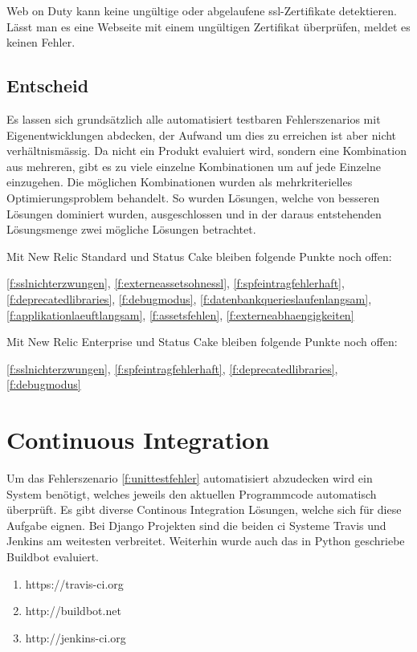 Web on Duty kann keine ungültige oder abgelaufene \acrshort{ssl}-Zertifikate detektieren. Lässt man es eine Webseite mit einem ungültigen Zertifikat überprüfen, meldet es keinen Fehler.

\subsection{Entscheid}
\label{sub:entscheid_monitoring}
Es lassen sich grundsätzlich alle automatisiert testbaren Fehlerszenarios mit Eigenentwicklungen abdecken, der Aufwand um dies zu erreichen ist aber nicht verhältnismässig. Da nicht ein Produkt evaluiert wird, sondern eine Kombination aus mehreren, gibt es zu viele einzelne Kombinationen um auf jede Einzelne einzugehen. Die möglichen Kombinationen wurden als mehrkriterielles Optimierungsproblem behandelt. So wurden Lösungen, welche von besseren Lösungen dominiert wurden, ausgeschlossen und in der daraus entstehenden Lösungsmenge zwei mögliche Lösungen betrachtet.


Mit New Relic Standard und Status Cake bleiben folgende Punkte noch offen:

\ref{f:sslnichterzwungen}, \ref{f:externeassetsohnessl}, \ref{f:spfeintragfehlerhaft}, \ref{f:deprecatedlibraries}, \ref{f:debugmodus}, \ref{f:datenbankquerieslaufenlangsam}, \ref{f:applikationlaeuftlangsam}, \ref{f:assetsfehlen}, \ref{f:externeabhaengigkeiten}

Mit New Relic Enterprise und Status Cake bleiben folgende Punkte noch offen:

\ref{f:sslnichterzwungen}, \ref{f:spfeintragfehlerhaft}, \ref{f:deprecatedlibraries}, \ref{f:debugmodus}

\section{Continuous Integration}
\label{sec:continuous_integration_evaluation}
Um das Fehlerszenario \ref{f:unittestfehler} automatisiert abzudecken wird ein System benötigt, welches jeweils den aktuellen Programmcode automatisch überprüft. Es gibt diverse Continous Integration Lösungen, welche sich für diese Aufgabe eignen. Bei Django Projekten sind die beiden \acrshort{ci} Systeme Travis und Jenkins am weitesten verbreitet. Weiterhin wurde auch das in Python geschriebe Buildbot evaluiert.

\begin{enumerate}
  \item https://travis-ci.org
  \item http://buildbot.net
  \item http://jenkins-ci.org
\end{enumerate}

